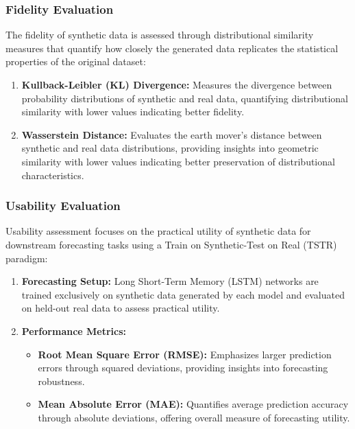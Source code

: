 \documentclass{article}
\begin{document}
\subsubsection{Fidelity Evaluation}
The fidelity of synthetic data is assessed through distributional similarity measures that quantify how closely the generated data replicates the statistical properties of the original dataset:

\begin{enumerate}
    \item \textbf{Kullback-Leibler (KL) Divergence:} Measures the divergence between probability distributions of synthetic and real data, quantifying distributional similarity with lower values indicating better fidelity.
    
    \item \textbf{Wasserstein Distance:} Evaluates the earth mover's distance between synthetic and real data distributions, providing insights into geometric similarity with lower values indicating better preservation of distributional characteristics.
\end{enumerate}

\subsubsection{Usability Evaluation}
Usability assessment focuses on the practical utility of synthetic data for downstream forecasting tasks using a Train on Synthetic-Test on Real (TSTR) paradigm:

\begin{enumerate}
    \item \textbf{Forecasting Setup:} Long Short-Term Memory (LSTM) networks are trained exclusively on synthetic data generated by each model and evaluated on held-out real data to assess practical utility.
    
    \item \textbf{Performance Metrics:} 
    \begin{itemize}
        \item \textbf{Root Mean Square Error (RMSE):} Emphasizes larger prediction errors through squared deviations, providing insights into forecasting robustness.
        \item \textbf{Mean Absolute Error (MAE):} Quantifies average prediction accuracy through absolute deviations, offering overall measure of forecasting utility.
    \end{itemize}
\end{enumerate}
\end{document}
